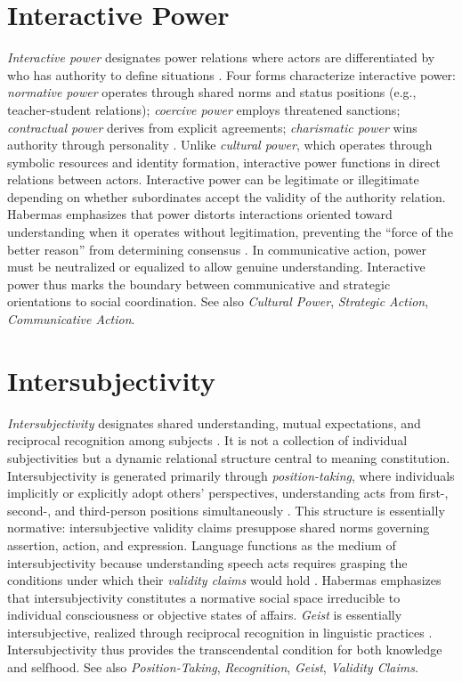 \documentclass{book}
\begin{document}
\section{Interactive Power}

\textit{Interactive power} designates power relations where actors are differentiated by who has authority to define situations \parencite[129]{Carspecken1995aa}. Four forms characterize interactive power: \textit{normative power} operates through shared norms and status positions (e.g., teacher-student relations); \textit{coercive power} employs threatened sanctions; \textit{contractual power} derives from explicit agreements; \textit{charismatic power} wins authority through personality \parencite[46, 130--131]{Carspecken1995aa}. Unlike \textit{cultural power}, which operates through symbolic resources and identity formation, interactive power functions in direct relations between actors. Interactive power can be legitimate or illegitimate depending on whether subordinates accept the validity of the authority relation. Habermas emphasizes that power distorts interactions oriented toward understanding when it operates without legitimation, preventing the ``force of the better reason'' from determining consensus \parencite[46]{Carspecken1999}. In communicative action, power must be neutralized or equalized to allow genuine understanding. Interactive power thus marks the boundary between communicative and strategic orientations to social coordination. See also \textit{Cultural Power}, \textit{Strategic Action}, \textit{Communicative Action}.

\section{Intersubjectivity}

\textit{Intersubjectivity} designates shared understanding, mutual expectations, and reciprocal recognition among subjects \parencite{Carspecken1999}. It is not a collection of individual subjectivities but a dynamic relational structure central to meaning constitution. Intersubjectivity is generated primarily through \textit{position-taking}, where individuals implicitly or explicitly adopt others' perspectives, understanding acts from first-, second-, and third-person positions simultaneously \parencite{Carspecken1999, Carspecken1995aa}. This structure is essentially normative: intersubjective validity claims presuppose shared norms governing assertion, action, and expression. Language functions as the medium of intersubjectivity because understanding speech acts requires grasping the conditions under which their \textit{validity claims} would hold \parencite{Carspecken1999}. Habermas emphasizes that intersubjectivity constitutes a normative social space irreducible to individual consciousness or objective states of affairs. \textit{Geist} is essentially intersubjective, realized through reciprocal recognition in linguistic practices \parencite{Negarestani2018}. Intersubjectivity thus provides the transcendental condition for both knowledge and selfhood. See also \textit{Position-Taking}, \textit{Recognition}, \textit{Geist}, \textit{Validity Claims}.
\end{document}
